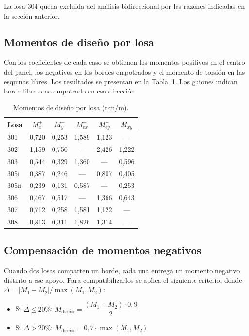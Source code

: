 La losa 304 queda excluida del análisis bidireccional por las razones indicadas en la sección anterior.
 
\subsection{Momentos de diseño por losa}
 
Con los coeficientes de cada caso se obtienen los momentos positivos en el centro del panel, los negativos en los bordes empotrados y el momento de torsión en las esquinas libres. Los resultados se presentan en la Tabla~\ref{tab:momentos}. Los guiones indican borde libre o no empotrado en esa dirección.
 
\begin{table}[h!]
\centering
\caption{Momentos de diseño por losa (t$\cdot$m/m).}
\label{tab:momentos}
\begin{tabular}{lccccc}
\toprule
Losa  & $M_x^{+}$ & $M_y^{+}$ & $M_{ex}^{-}$ & $M_{ey}^{-}$ & $M_{xy}$ \\
\midrule
301   & 0{,}720 & 0{,}253 & 1{,}589 & 1{,}123 & ---     \\
302   & 1{,}159 & 0{,}750 & ---     & 2{,}426 & 1{,}222 \\
303   & 0{,}544 & 0{,}329 & 1{,}360 & ---     & 0{,}596 \\
305i  & 0{,}387 & 0{,}246 & ---     & 0{,}807 & 0{,}405 \\
305ii & 0{,}239 & 0{,}131 & 0{,}587 & ---     & 0{,}253 \\
306   & 0{,}467 & 0{,}517 & ---     & 1{,}366 & 0{,}643 \\
307   & 0{,}712 & 0{,}258 & 1{,}581 & 1{,}122 & ---     \\
308   & 0{,}813 & 0{,}311 & 1{,}826 & 1{,}314 & ---     \\
\bottomrule
\end{tabular}
\end{table}
 
\subsection{Compensación de momentos negativos}
 
Cuando dos losas comparten un borde, cada una entrega un momento negativo distinto a ese apoyo. Para compatibilizarlos se aplica el siguiente criterio, donde $\Delta = |M_1 - M_2|/\max(M_1, M_2)$:
 
\begin{itemize}
    \item Si $\Delta \leq 20\%$: \quad $M_{\text{diseño}} = \dfrac{(M_1 + M_2)\cdot 0{,}9}{2}$
    \item Si $\Delta > 20\%$: \quad $M_{\text{diseño}} = 0{,}7 \cdot \max(M_1, M_2)$
\end{itemize}
 
